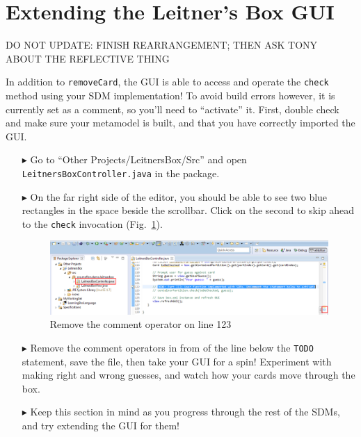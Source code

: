 \newpage
\hypertarget{sec:extendGui}{}
\section{Extending the Leitner's Box GUI}
\genHeader

\vspace{0.5cm}

{DO NOT UPDATE: FINISH REARRANGEMENT; THEN ASK TONY ABOUT THE REFLECTIVE THING}

In addition to \texttt{removeCard}, the GUI is able to access and operate the \texttt{check} method using your SDM implementation! To avoid build errors
however, it is currently set as a comment, so you'll need to ``activate'' it. First, double check and make sure your metamodel is built, and that you have
correctly imported the GUI.

\begin{itemize}

\item[$\blacktriangleright$] Go to ``Other Projects/LeitnersBox/Src'' and open \texttt{Leitners\-Box\-Cont\-roller\-.java} in the package.

\vspace{0.5cm}

\item[$\blacktriangleright$] On the far right side of the editor, you should be able to see two blue rectangles in the space beside the scrollbar. Click on the
second to skip ahead to the \texttt{check} invocation (Fig.~\ref{fig:remComment}).

\vspace{0.5cm}

\begin{figure}[htp]
\begin{center}
  \includegraphics[width=\textwidth]{eclipse_GUICommentLine}
  \caption{Remove the comment operator on line 123}
  \label{fig:remComment}
\end{center}
\end{figure}

\vspace{0.5cm}

\item[$\blacktriangleright$] Remove the comment operators in from of the line below the \texttt{TODO} statement, save the file, then take your GUI for a spin!
Experiment with making right and wrong guesses, and watch how your cards move through the box. 

\item[$\blacktriangleright$] Keep this section in mind as you progress through the rest of the SDMs, and try extending the GUI for them!

\end{itemize}
